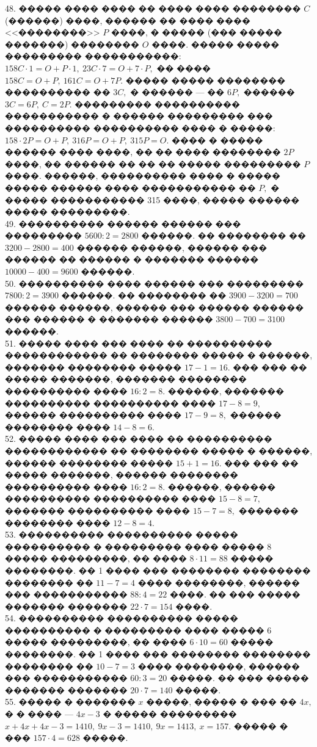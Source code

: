 \documentclass[12pt]{article}
\begin{document}
48. ����� ���� ���� �� ���� ���� �������� $C$ (������) ����, ������ �� ���� ���� <<��������>> $P$ ����, � ����� (��� ����� �������) �������� $O$ ����. ����� ����� ��������� �����������: $158C\cdot1=O+P\cdot1,\ 23C\cdot7=O+7\cdot P,$ �� ���� $158C=O+P,\ 161C=O+7P.$ ����� ����� �������� ���������� �� $3C,$ � ������ --- �� $6P,$ ������ $3C=6P,\ C=2P.$ ��������� ���������� ����������� � ������ ��������� ��� ���������� ���������� ���� � �����: $158\cdot2P=O+P,\ 316P=O+P,\ 315P=O.$ ���� � ����� ������ ���� ����, �� �� ���� �������� $2P$ ����, �� ������ �� �� �� ����� ��������� $P$ ����. ������, ���������� ���� � ����� ����� ������ ���� ����������� �� $P,$ � ����� ����������� 315 ����, ����� ������ ����� ���������.\\
49. ���������� ������ ������ ��� ��������� $5600:2=2800$ ������. �� �������� �� $3200-2800=400$ ������ ������, ������ ��� ������ �� ������ � ������� ������ $10000-400=9600$ ������.\\
50. ���������� ���� ������ ��� ��������� $7800:2=3900$ ������. �� �������� �� $3900-3200=700$ ������ ������, ������ ��� ������ ������ ��� ������ � ������� ������ $3800-700=3100$ ������.\\
51. ����� ���� ��� ���� �� ���������� ������������ �� �������� ����� � ������, ������� �������� ����� $17-1=16.$ ��� ��� �� ����� �������, ������� �������� ���������� ���� $16:2=8.$ ������, ������� ���������� ���������� ���� $17-8=9,$ ������ ���������� ���� $17-9=8,$ ������ �������� ���� $14-8=6.$\\
52. ����� ���� ��� ���� �� ���������� ������������ �� �������� ����� � ������, ������ �������� ����� $15+1=16.$ ��� ��� �� ����� �������, ������ �������� ���������� ���� $16:2=8.$ ������, ������ ���������� ���������� ���� $15-8=7,$ ������� ���������� ���� $15-7=8,$ ������� �������� ���� $12-8=4.$\\
53. ���������� ���������� ����� ���������� � ��������� ���� ����� 8 ����� ���������, �� ���� $8\cdot11=88$ ����� ��������. �� 1 ���� ��� �������� �������� �������� �� $11-7=4$ ���� ��������, ������ ��� ����������� $88:4=22$ ����. �� ��� ����� ������� ������� $22\cdot7=154$ ����.\\
54. ���������� ���������� ����� ���������� � ��������� ���� ����� 6 ����� ���������, �� ���� $6\cdot10=60$ ����� ��������. �� 1 ���� ��� �������� �������� �������� �� $10-7=3$ ���� ��������, ������ ��� ����������� $60:3=20$ �����. �� ��� ����� ������� ������� $20\cdot7=140$ �����.\\
55. ����� � ������� $x$ �����, ����� � ��� �� $4x,$ � � ���� --- $4x-3$ � ����� ��������� $x+4x+4x-3=1410,\ 9x-3=1410,\ 9x=1413,\ x=157.$ ����� � ��� $157\cdot4=628$ �����.\\
\end{document}
